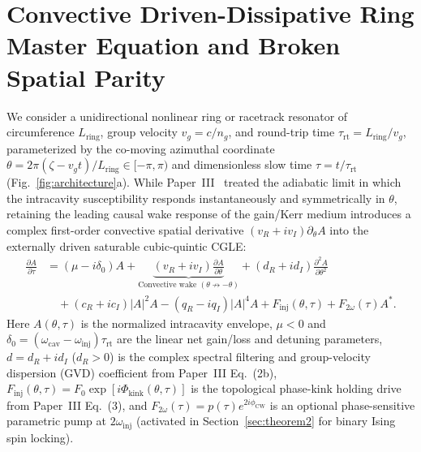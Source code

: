 \documentclass[11pt,letterpaper]{article}
\begin{document}
\section{Convective Driven-Dissipative Ring Master Equation and Broken Spatial Parity}
\label{sec:model}

We consider a unidirectional nonlinear ring or racetrack resonator of circumference $L_{\mathrm{ring}}$, group velocity $v_g = c/n_g$, and round-trip time $\tau_{\mathrm{rt}} = L_{\mathrm{ring}}/v_g$, parameterized by the co-moving azimuthal coordinate $\theta = 2\pi(\zeta - v_g t)/L_{\mathrm{ring}} \in [-\pi, \pi)$ and dimensionless slow time $\tau = t/\tau_{\mathrm{rt}}$ (Fig.~\ref{fig:architecture}a). While Paper~III~\cite{OwnbyPaper3_2026} treated the adiabatic limit in which the intracavity susceptibility responds instantaneously and symmetrically in $\theta$, retaining the leading causal wake response of the gain/Kerr medium introduces a complex first-order convective spatial derivative $(v_R + i v_I)\partial_\theta A$ into the externally driven saturable cubic-quintic CGLE:
\begin{align}
\frac{\partial A}{\partial \tau} &= \left(\mu - i\delta_0\right) A + \underbrace{\left(v_R + i v_I\right)\frac{\partial A}{\partial \theta}}_{\text{Convective wake }(\theta \not\to -\theta)} + \left(d_R + i d_I\right)\frac{\partial^2 A}{\partial \theta^2} \nonumber\\
&\quad + \left(c_R + i c_I\right)|A|^2 A - \left(q_R - i q_I\right)|A|^4 A + F_{\mathrm{inj}}(\theta, \tau) + F_{2\omega}(\tau)A^*.
\label{eq:convective_cgle}
\end{align}
Here $A(\theta, \tau)$ is the normalized intracavity envelope, $\mu < 0$ and $\delta_0 = (\omega_{\mathrm{cav}} - \omega_{\mathrm{inj}})\tau_{\mathrm{rt}}$ are the linear net gain/loss and detuning parameters, $d = d_R + i d_I$ ($d_R > 0$) is the complex spectral filtering and group-velocity dispersion (GVD) coefficient from Paper~III Eq.~(2b), $F_{\mathrm{inj}}(\theta, \tau) = F_0 \exp[i\Phi_{\mathrm{kink}}(\theta, \tau)]$ is the topological phase-kink holding drive from Paper~III Eq.~(3), and $F_{2\omega}(\tau) = p(\tau)e^{2i\phi_{\mathrm{CW}}}$ is an optional phase-sensitive parametric pump at $2\omega_{\mathrm{inj}}$ (activated in Section~\ref{sec:theorem2} for binary Ising spin locking).
\end{document}
